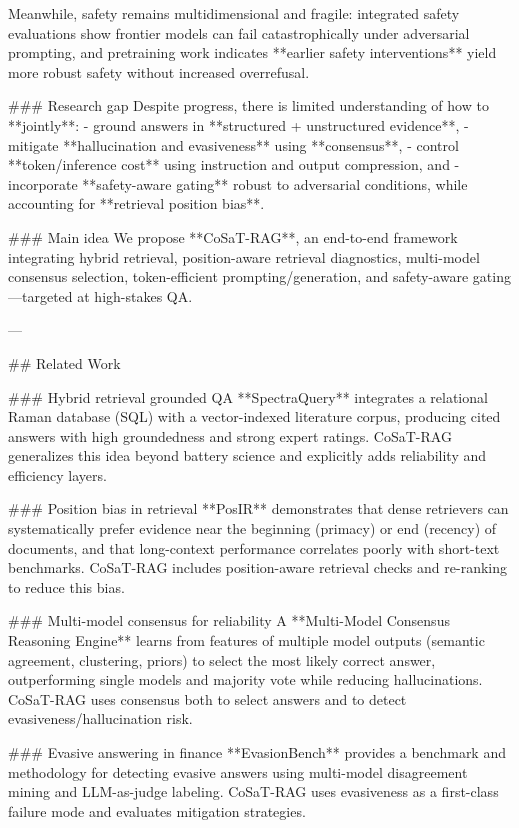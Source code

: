 Meanwhile, safety remains multidimensional and fragile: integrated safety evaluations show frontier models can fail catastrophically under adversarial prompting, and pretraining work indicates **earlier safety interventions** yield more robust safety without increased overrefusal.

### Research gap  
Despite progress, there is limited understanding of how to **jointly**:  
- ground answers in **structured + unstructured evidence**,  
- mitigate **hallucination and evasiveness** using **consensus**,  
- control **token/inference cost** using instruction and output compression, and  
- incorporate **safety-aware gating** robust to adversarial conditions,  
while accounting for **retrieval position bias**.

### Main idea  
We propose **CoSaT-RAG**, an end-to-end framework integrating hybrid retrieval, position-aware retrieval diagnostics, multi-model consensus selection, token-efficient prompting/generation, and safety-aware gating—targeted at high-stakes QA.

---

## Related Work  

### Hybrid retrieval grounded QA  
**SpectraQuery** integrates a relational Raman database (SQL) with a vector-indexed literature corpus, producing cited answers with high groundedness and strong expert ratings. CoSaT-RAG generalizes this idea beyond battery science and explicitly adds reliability and efficiency layers.

### Position bias in retrieval  
**PosIR** demonstrates that dense retrievers can systematically prefer evidence near the beginning (primacy) or end (recency) of documents, and that long-context performance correlates poorly with short-text benchmarks. CoSaT-RAG includes position-aware retrieval checks and re-ranking to reduce this bias.

### Multi-model consensus for reliability  
A **Multi-Model Consensus Reasoning Engine** learns from features of multiple model outputs (semantic agreement, clustering, priors) to select the most likely correct answer, outperforming single models and majority vote while reducing hallucinations. CoSaT-RAG uses consensus both to select answers and to detect evasiveness/hallucination risk.

### Evasive answering in finance  
**EvasionBench** provides a benchmark and methodology for detecting evasive answers using multi-model disagreement mining and LLM-as-judge labeling. CoSaT-RAG uses evasiveness as a first-class failure mode and evaluates mitigation strategies.

